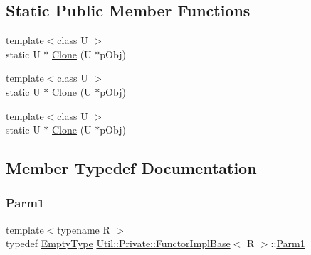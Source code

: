 \subsection*{Static Public Member Functions}
\begin{DoxyCompactItemize}
\item 
{\footnotesize template$<$class U $>$ }\\static U $\ast$ \mbox{\hyperlink{structUtil_1_1Private_1_1FunctorImplBase_a6422eebe7e94d8eb6f17e14d67c283f1}{Clone}} (U $\ast$p\+Obj)
\item 
{\footnotesize template$<$class U $>$ }\\static U $\ast$ \mbox{\hyperlink{structUtil_1_1Private_1_1FunctorImplBase_a6422eebe7e94d8eb6f17e14d67c283f1}{Clone}} (U $\ast$p\+Obj)
\item 
{\footnotesize template$<$class U $>$ }\\static U $\ast$ \mbox{\hyperlink{structUtil_1_1Private_1_1FunctorImplBase_a6422eebe7e94d8eb6f17e14d67c283f1}{Clone}} (U $\ast$p\+Obj)
\end{DoxyCompactItemize}


\subsection{Member Typedef Documentation}
\mbox{\label{structUtil_1_1Private_1_1FunctorImplBase_a9d61e693d6c616dea5bd9d9073c7d21a}} 
\subsubsection{\texorpdfstring{Parm1}{Parm1}\hspace{0.1cm}{\footnotesize\ttfamily [1/3]}}
{\footnotesize\ttfamily template$<$typename R $>$ \\
typedef \mbox{\hyperlink{classUtil_1_1EmptyType}{Empty\+Type}} \mbox{\hyperlink{structUtil_1_1Private_1_1FunctorImplBase}{Util\+::\+Private\+::\+Functor\+Impl\+Base}}$<$ R $>$\+::\mbox{\hyperlink{structUtil_1_1Private_1_1FunctorImplBase_a9d61e693d6c616dea5bd9d9073c7d21a}{Parm1}}}

\mbox{\label{structUtil_1_1Private_1_1FunctorImplBase_a9d61e693d6c616dea5bd9d9073c7d21a}} 
